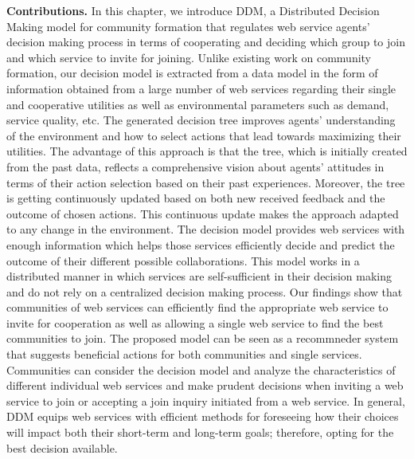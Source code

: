 \textbf{Contributions.} In this chapter, we introduce DDM, a Distributed Decision Making model for community formation that regulates web service agents’ decision making process in terms of cooperating and deciding which group to join and which service to invite for joining. Unlike existing work on community formation, our decision model is extracted from a data model in the form of information obtained from a large number of web services regarding their single and cooperative utilities as well as environmental parameters such as demand, service quality, etc. The generated decision tree improves agents' understanding of the environment and how to select actions that lead towards maximizing their utilities. The advantage of this approach is that the tree, which is initially created from the past data, reflects a comprehensive vision about agents' attitudes in terms of their action selection based on their past experiences. Moreover, the tree is getting continuously updated based on both new received feedback and the outcome of chosen actions. This continuous update makes the approach adapted to any change in the environment.
The decision model provides web services with enough information which helps those services efficiently decide and predict the outcome of their different possible collaborations. This model works in a distributed manner in which services are self-sufficient in their decision making and do not rely on a centralized decision making process. Our findings show that communities of web services can efficiently find the appropriate web service to invite for cooperation as well as allowing a single web service to find the best communities to join. The proposed model can be seen as a recommneder system that suggests beneficial actions for both communities and single services. Communities can consider the decision model and analyze the characteristics of different individual web services and make prudent decisions when inviting a web service to join or accepting a join inquiry initiated from a web service. In general, DDM equips web services with efficient methods for foreseeing how their choices will impact both their short-term and long-term goals; therefore, opting for the best decision available.


